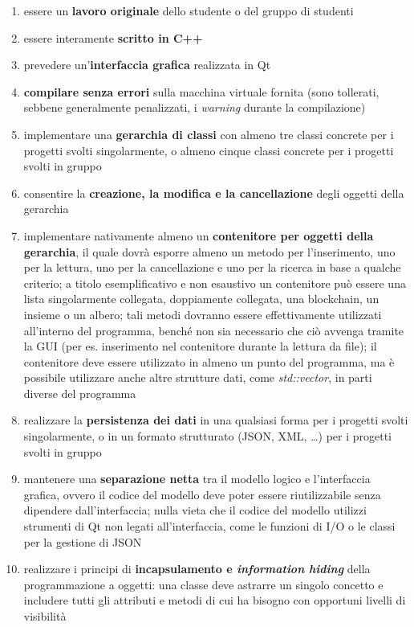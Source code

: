 \documentclass[10pt,a4paper,oneside]{article}
\begin{document}
\begin{enumerate}
 \item essere un \textbf{lavoro originale} dello studente o del gruppo di studenti
 \item essere interamente \textbf{scritto in C++}
 \item prevedere un'\textbf{interfaccia grafica} realizzata in Qt
 \item \textbf{compilare senza errori} sulla macchina virtuale fornita (sono tollerati, sebbene generalmente penalizzati, i \emph{warning} durante la compilazione)
 \item implementare una \textbf{gerarchia di classi} con almeno tre classi concrete per i progetti svolti singolarmente, o almeno cinque classi concrete per i progetti svolti in gruppo
 \item consentire la \textbf{creazione, la modifica e la cancellazione} degli oggetti della gerarchia
 \item implementare nativamente almeno un \textbf{contenitore per oggetti della gerarchia}, il quale dovrà esporre almeno un metodo per l'inserimento, uno per la lettura, uno per la cancellazione e uno per la ricerca in base a qualche criterio; a titolo esemplificativo e non esaustivo un contenitore può essere una lista singolarmente collegata, doppiamente collegata, una blockchain, un insieme o un albero; tali metodi dovranno essere effettivamente utilizzati all'interno del programma, benché non sia necessario che ciò avvenga tramite la GUI (per es. inserimento nel contenitore durante la lettura da file); il contenitore deve essere utilizzato in almeno un punto del programma, ma è possibile utilizzare anche altre strutture dati, come \emph{std::vector}, in parti diverse del programma
 \item realizzare la \textbf{persistenza dei dati} in una qualsiasi forma per i progetti svolti singolarmente, o in un formato strutturato (JSON, XML, \ldots) per i progetti svolti in gruppo
 \item mantenere una \textbf{separazione netta} tra il modello logico e l'interfaccia grafica, ovvero il codice del modello deve poter essere riutilizzabile senza dipendere dall'interfaccia; nulla vieta che il codice del modello utilizzi strumenti di Qt non legati all'interfaccia, come le funzioni di I/O o le classi per la gestione di JSON
 \item realizzare i principi di \textbf{incapsulamento e \emph{information hiding}} della programmazione a oggetti: una classe deve astrarre un singolo concetto e includere tutti gli attributi e metodi di cui ha bisogno con opportuni livelli di visibilità

\end{enumerate}
\end{document}
